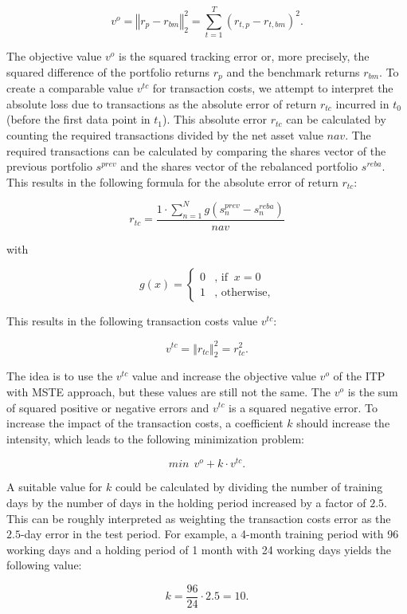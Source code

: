 \documentclass[
  oneside, a4paper, 12pt, openany]{book}
\theoremstyle{definition}
\theoremstyle{definition}
\theoremstyle{definition}
\theoremstyle{definition}
\theoremstyle{remark}
\begin{document}
\[
 v^o = \left\Vert r_{p}-r_{bm} \right\Vert_2^2 = \sum_{t=1}^T (r_{t,p}-r_{t,bm})^2.
\]

The objective value \(v^o\) is the squared tracking error or, more precisely, the squared difference of the portfolio returns \(r_p\) and the benchmark returns \(r_{bm}\). To create a comparable value \(v^{tc}\) for transaction costs, we attempt to interpret the absolute loss due to transactions as the absolute error of return \(r_{tc}\) incurred in \(t_0\) (before the first data point in \(t_1\)). This absolute error \(r_{tc}\) can be calculated by counting the required transactions divided by the net asset value \(nav\). The required transactions can be calculated by comparing the shares vector of the previous portfolio \(s^{prev}\) and the shares vector of the rebalanced portfolio \(s^{reba}\). This results in the following formula for the absolute error of return \(r_{tc}\):

\[
 r_{tc} = \frac{1 \cdot \sum_{n=1}^N g(s^{prev}_n-s^{reba}_n) }{nav}
\]

with

\[
  g(x) =    \begin{cases}
  0 &\text{, if }\ x = 0\\
  1 &\text{, otherwise,}
  \end{cases}
\]

This results in the following transaction costs value \(v^{tc}\):

\[
v^{tc} = \left\Vert r_{tc} \right\Vert_2^2 = r_{tc}^2.
\]

The idea is to use the \(v^{tc}\) value and increase the objective value \(v^o\) of the ITP with MSTE approach, but these values are still not the same. The \(v^o\) is the sum of squared positive or negative errors and \(v^{tc}\) is a squared negative error. To increase the impact of the transaction costs, a coefficient \(k\) should increase the intensity, which leads to the following minimization problem:

\[
  min \ \  v^o + k \cdot v^{tc}.
\]

A suitable value for \(k\) could be calculated by dividing the number of training days by the number of days in the holding period increased by a factor of \(2.5\). This can be roughly interpreted as weighting the transaction costs error as the \(2.5\)-day error in the test period. For example, a 4-month training period with 96 working days and a holding period of 1 month with 24 working days yields the following value:

\[
  k = \frac{96}{24} \cdot 2.5 = 10.
\]
\end{document}
